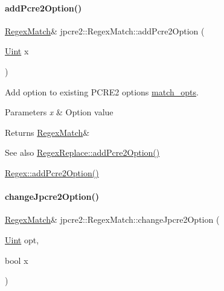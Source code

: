\paragraph{\texorpdfstring{add\+Pcre2\+Option()}{addPcre2Option()}}
{\footnotesize\ttfamily \hyperlink{classjpcre2_1_1RegexMatch}{Regex\+Match}\& jpcre2\+::\+Regex\+Match\+::add\+Pcre2\+Option (\begin{DoxyParamCaption}\item[{\hyperlink{namespacejpcre2_a078242d38221a13fb3543b9edd78c099}{Uint}}]{x }\end{DoxyParamCaption})\hspace{0.3cm}{\ttfamily [inline]}}



Add option to existing P\+C\+R\+E2 options \hyperlink{classjpcre2_1_1RegexMatch_a697d5731007350b0f20d2018fcfafa90}{match\+\_\+opts}. 


\begin{DoxyParams}{Parameters}
{\em x} & Option value \\
\hline
\end{DoxyParams}
\begin{DoxyReturn}{Returns}
\hyperlink{classjpcre2_1_1RegexMatch}{Regex\+Match}\& 
\end{DoxyReturn}
\begin{DoxySeeAlso}{See also}
\hyperlink{classjpcre2_1_1RegexReplace_a3cfd03568b23bebcbb530a2c120b5d33_a3cfd03568b23bebcbb530a2c120b5d33}{Regex\+Replace\+::add\+Pcre2\+Option()} 

\hyperlink{classjpcre2_1_1Regex_a2c7dcf12f26b2b046e147b013c8b5087_a2c7dcf12f26b2b046e147b013c8b5087}{Regex\+::add\+Pcre2\+Option()} 
\end{DoxySeeAlso}
\hypertarget{classjpcre2_1_1RegexMatch_a154430c66b8794d6632be6211a3ce870_a154430c66b8794d6632be6211a3ce870}{}\label{classjpcre2_1_1RegexMatch_a154430c66b8794d6632be6211a3ce870_a154430c66b8794d6632be6211a3ce870} 
\paragraph{\texorpdfstring{change\+Jpcre2\+Option()}{changeJpcre2Option()}}
{\footnotesize\ttfamily \hyperlink{classjpcre2_1_1RegexMatch}{Regex\+Match}\& jpcre2\+::\+Regex\+Match\+::change\+Jpcre2\+Option (\begin{DoxyParamCaption}\item[{\hyperlink{namespacejpcre2_a078242d38221a13fb3543b9edd78c099}{Uint}}]{opt,  }\item[{bool}]{x }\end{DoxyParamCaption})\hspace{0.3cm}{\ttfamily [inline]}}



